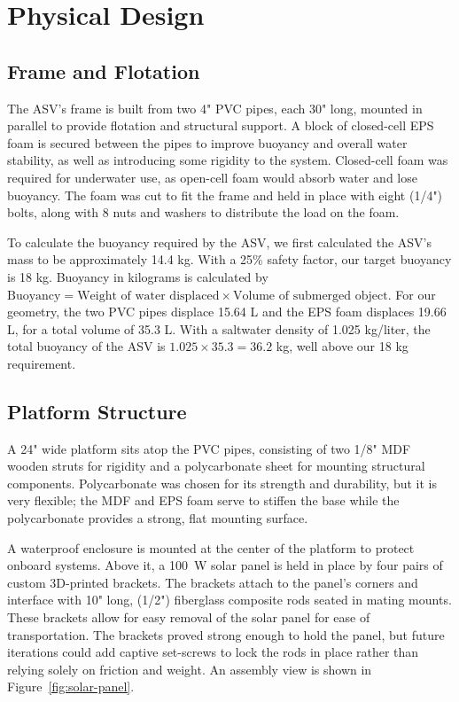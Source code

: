 \section{Physical Design}
\subsection{Frame and Flotation}
The ASV's frame is built from two 4" PVC pipes, each 30" long, mounted in parallel to provide flotation and structural support. A block of closed-cell EPS foam is secured between the pipes to improve buoyancy and overall water stability, as well as introducing some rigidity to the system. Closed-cell foam was required for underwater use, as open-cell foam would absorb water and lose buoyancy. The foam was cut to fit the frame and held in place with eight (1/4") bolts, along with 8 nuts and washers to distribute the load on the foam. 

To calculate the buoyancy required by the ASV, we first calculated the ASV's mass to be approximately 14.4 kg. With a 25\% safety factor, our target buoyancy is 18 kg. Buoyancy in kilograms is calculated by \(\text{Buoyancy} = \text{Weight of water displaced} \times \text{Volume of submerged object}\). For our geometry, the two PVC pipes displace 15.64 L and the EPS foam displaces 19.66 L, for a total volume of 35.3 L. With a saltwater density of 1.025 kg/liter, the total buoyancy of the ASV is \(1.025 \times 35.3 = 36.2 \) kg, well above our 18 kg requirement.

\subsection{Platform Structure}
A 24" wide platform sits atop the PVC pipes, consisting of two 1/8" MDF wooden struts for rigidity and a polycarbonate sheet for mounting structural components. Polycarbonate was chosen for its strength and durability, but it is very flexible; the MDF and EPS foam serve to stiffen the base while the polycarbonate provides a strong, flat mounting surface.

A waterproof enclosure is mounted at the center of the platform to protect onboard systems. Above it, a \SI{100}{\watt} solar panel is held in place by four pairs of custom 3D-printed brackets. The brackets attach to the panel's corners and interface with 10" long, (1/2") fiberglass composite rods seated in mating mounts. These brackets allow for easy removal of the solar panel for ease of transportation. The brackets proved strong enough to hold the panel, but future iterations could add captive set-screws to lock the rods in place rather than relying solely on friction and weight. An assembly view is shown in Figure~\ref{fig:solar-panel}.

